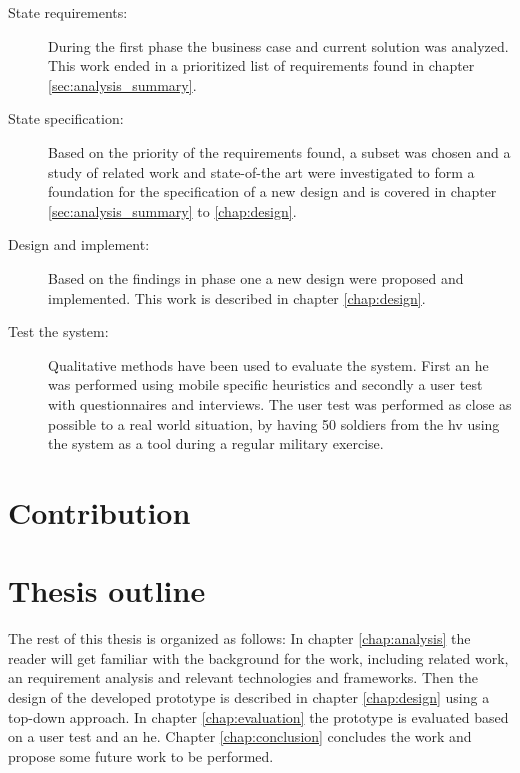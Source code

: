 \begin{description}
	\item[State requirements:] During the first phase the business case and current solution was analyzed. This work ended in a prioritized list of requirements found in chapter \ref{sec:analysis_summary}.

	\item[State specification:] Based on the priority of the requirements found, a subset was chosen and a study of related work and state-of-the art were investigated to form a foundation for the specification of a new design and is covered in chapter \ref{sec:analysis_summary} to \ref{chap:design}.

	\item[Design and implement:] Based on the findings in phase one a new design were proposed and implemented. This work is described in chapter \ref{chap:design}.
	
	\item[Test the system:] Qualitative methods have been used to evaluate the system. First an \gls{he} was performed using mobile specific heuristics and secondly a user test with questionnaires and interviews. The user test was performed as close as possible to a real world situation, by having 50 soldiers from the \gls{hv} using the system as a tool during a regular military exercise.

\end{description}


\section{Contribution}

\section{Thesis outline}
The rest of this thesis is organized as follows:
In chapter \ref{chap:analysis} the reader will get familiar with the background for the work, including related work, an requirement analysis and relevant technologies and frameworks. Then the design of the developed prototype is described in chapter \ref{chap:design} using a top-down approach. In chapter \ref{chap:evaluation} the prototype is evaluated based on a user test and an \gls{he}. Chapter \ref{chap:conclusion} concludes the work and propose some future work to be performed.


